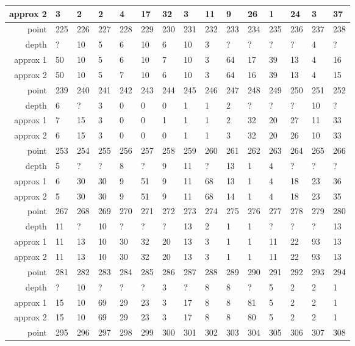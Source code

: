 \begin{center}
\begin{supertabular}{|r|l l l l l l l l l l l l l l|}
approx 2 & 3 & 2 & 2 & 4 & 17 & 32 & 3 & 11 & 9 & 26 & 1 & 24 & 3 & 37 \\
\hline
point & 225 & 226 & 227 & 228 & 229 & 230 & 231 & 232 & 233 & 234 & 235 & 236 & 237 & 238 \\
\hline
depth & ? & 10 & 5 & 6 & 10 & 6 & 10 & 3 & ? & ? & ? & ? & 4 & ? \\
approx 1 & 50 & 10 & 5 & 6 & 10 & 7 & 10 & 3 & 64 & 17 & 39 & 13 & 4 & 16 \\
approx 2 & 50 & 10 & 5 & 7 & 10 & 6 & 10 & 3 & 64 & 16 & 39 & 13 & 4 & 15 \\
\hline
point & 239 & 240 & 241 & 242 & 243 & 244 & 245 & 246 & 247 & 248 & 249 & 250 & 251 & 252 \\
\hline
depth & 6 & ? & 3 & 0 & 0 & 0 & 1 & 1 & 2 & ? & ? & ? & 10 & ? \\
approx 1 & 7 & 15 & 3 & 0 & 0 & 1 & 1 & 1 & 2 & 32 & 20 & 27 & 11 & 33 \\
approx 2 & 6 & 15 & 3 & 0 & 0 & 0 & 1 & 1 & 3 & 32 & 20 & 26 & 10 & 33 \\
\hline
point & 253 & 254 & 255 & 256 & 257 & 258 & 259 & 260 & 261 & 262 & 263 & 264 & 265 & 266 \\
\hline
depth & 5 & ? & ? & 8 & ? & 9 & 11 & ? & 13 & 1 & 4 & ? & ? & ? \\
approx 1 & 6 & 30 & 30 & 9 & 51 & 9 & 11 & 68 & 13 & 1 & 4 & 18 & 23 & 36 \\
approx 2 & 5 & 30 & 30 & 9 & 51 & 9 & 11 & 68 & 14 & 1 & 4 & 18 & 23 & 35 \\
\hline
point & 267 & 268 & 269 & 270 & 271 & 272 & 273 & 274 & 275 & 276 & 277 & 278 & 279 & 280 \\
\hline
depth & 11 & ? & 10 & ? & ? & ? & 13 & 2 & 1 & 1 & ? & ? & ? & 13 \\
approx 1 & 11 & 13 & 10 & 30 & 32 & 20 & 13 & 3 & 1 & 1 & 11 & 22 & 93 & 13 \\
approx 2 & 11 & 13 & 10 & 30 & 32 & 20 & 13 & 3 & 1 & 1 & 11 & 22 & 93 & 13 \\
\hline
point & 281 & 282 & 283 & 284 & 285 & 286 & 287 & 288 & 289 & 290 & 291 & 292 & 293 & 294 \\
\hline
depth & ? & 10 & ? & ? & ? & 3 & ? & 8 & 8 & ? & 5 & 2 & 2 & 1 \\
approx 1 & 15 & 10 & 69 & 29 & 23 & 3 & 17 & 8 & 8 & 81 & 5 & 2 & 2 & 1 \\
approx 2 & 15 & 10 & 69 & 29 & 23 & 3 & 17 & 8 & 8 & 80 & 5 & 2 & 2 & 1 \\
\hline
point & 295 & 296 & 297 & 298 & 299 & 300 & 301 & 302 & 303 & 304 & 305 & 306 & 307 & 308 \\

\end{supertabular}
\end{center}
